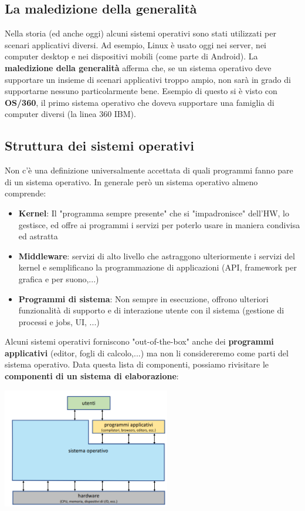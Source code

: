 \documentclass[12pt]{article}
\begin{document}
\subsection{La maledizione della generalità}
Nella storia (ed anche oggi) alcuni sistemi operativi sono stati utilizzati per scenari applicativi diversi.
Ad esempio, Linux è usato oggi nei server, nei computer desktop e nei dispositivi mobili (come parte di Android).
La \textbf{maledizione della generalità} afferma che, se un sistema operativo deve supportare un insieme di scenari applicativi troppo ampio,
non sarà in grado di supportarne nessuno particolarmente bene. Esempio di questo si è visto con \textbf{OS/360}, il primo sistema operativo che doveva supportare
una famiglia di computer diversi (la linea 360 IBM).
\subsection{Struttura dei sistemi operativi}
Non c'è una definizione universalmente accettata di quali programmi fanno pare di un sistema operativo. In generale però un sistema operativo almeno comprende:
\begin{itemize}
    \item \textbf{Kernel}: Il "programma sempre presente" che si "impadronisce" dell'HW, lo gestisce, ed offre ai programmi i servizi per poterlo usare in maniera condivisa ed astratta
    \item \textbf{Middleware}: servizi di alto livello che astraggono ulteriormente i servizi del kernel e semplificano la programmazione di applicazioni (API, framework per grafica e per suono,...)
    \item \textbf{Programmi di sistema}: Non sempre in esecuzione, offrono ulteriori funzionalità di supporto e di interazione utente con il sistema (gestione di processi e jobs, UI, ...)
\end{itemize}
Alcuni sistemi operativi forniscono "out-of-the-box" anche dei \textbf{programmi applicativi} (editor, fogli di calcolo,...) ma non li considereremo come parti del sistema operativo.
Data questa lista di componenti, possiamo rivisitare le \textbf{componenti di un sistema di elaborazione}:
\begin{center}
    \includegraphics[width = 0.55\textwidth]{Images/2.PNG}
\end{center}
\end{document}
